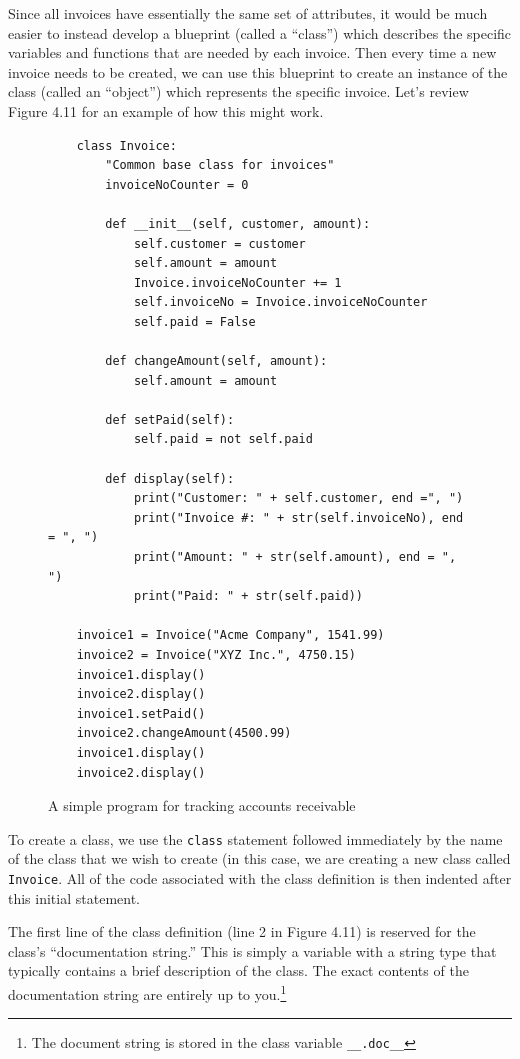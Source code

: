 \documentclass{book}
\begin{document}
Since all invoices have essentially the same set of attributes, it would be much easier to instead develop a blueprint (called a ``class'') which describes the specific variables and functions that are needed by each invoice. Then every time a new invoice needs to be created, we can use this blueprint to create an instance of the class (called an ``object'') which represents the specific invoice. Let's review Figure 4.11 for an example of how this might work.

\begin{figure}[h]
	\caption{A simple program for tracking accounts receivable}
	\begin{lstlisting}
	class Invoice:
		"Common base class for invoices"
		invoiceNoCounter = 0
	
		def __init__(self, customer, amount):
			self.customer = customer
			self.amount = amount
			Invoice.invoiceNoCounter += 1
			self.invoiceNo = Invoice.invoiceNoCounter
			self.paid = False
	
		def changeAmount(self, amount):
			self.amount = amount
	
		def setPaid(self):
			self.paid = not self.paid
	
		def display(self):
			print("Customer: " + self.customer, end =", ") 
			print("Invoice #: " + str(self.invoiceNo), end = ", ")
			print("Amount: " + str(self.amount), end = ", ")
			print("Paid: " + str(self.paid))
	
	invoice1 = Invoice("Acme Company", 1541.99)
	invoice2 = Invoice("XYZ Inc.", 4750.15)
	invoice1.display()
	invoice2.display()
	invoice1.setPaid()
	invoice2.changeAmount(4500.99)
	invoice1.display()
	invoice2.display()
	\end{lstlisting}
	
\end{figure}

To create a class, we use the \texttt{class} statement followed immediately by the name of the class that we wish to create (in this case, we are creating a new class called \texttt{Invoice}. All of the code associated with the class definition is then indented after this initial statement.

The first line of the class definition (line 2 in Figure 4.11) is reserved for the class's ``documentation string.'' This is simply a variable with a string type that typically contains a brief description of the class. The exact contents of the documentation string are entirely up to you.\footnote{The document string is stored in the class variable \texttt{\_\_.doc\_\_}}
\end{document}
